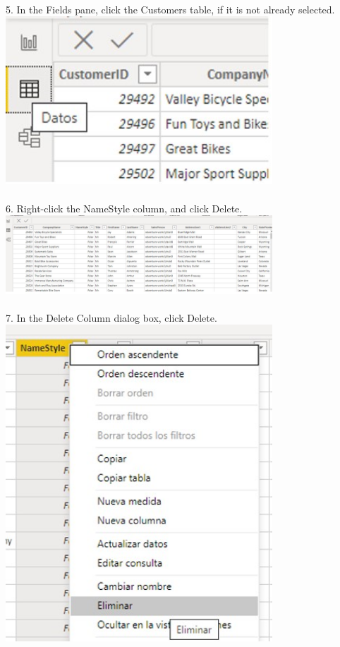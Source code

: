 \documentclass[preprint,12pt]{elsarticle}
\begin{document}
\begin{itemize}
		 		\\ 5. In the Fields pane, click the Customers table, if it is not already selected.
		 		\\ \includegraphics[width=10cm]{./IMAGENES/2.4} \\
		 		\\ 6. Right-click the NameStyle column, and click Delete.
		 		\\ \includegraphics[width=10cm]{./IMAGENES/2.5} \\
		 		\\ 7. In the Delete Column dialog box, click Delete.
		 		\\ \includegraphics[width=10cm]{./IMAGENES/2.6} \\

\end{itemize}
\end{document}

